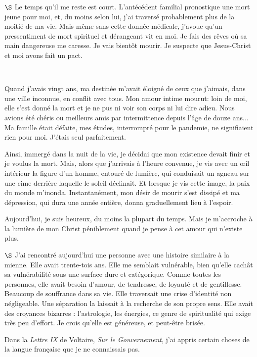 \documentclass[a4paper, 12pt]{article}
\begin{document}
\pagebreak 

$\S$ Le temps qu'il me reste est court. L'antécédent familial pronostique une
mort jeune pour moi, et, du moins selon lui, j'ai traversé probablement plus de
la moitié de ma vie. Mais même sans cette donnée médicale, j'avoue qu'un
pressentiment de mort spirituel et dérangeant vit en moi. Je fais des rêves où
sa main dangereuse me caresse. Je vais bientôt mourir. Je suspecte que
Jesus-Christ et moi avons fait un pact.

~

Quand j'avais vingt ans, ma destinée m'avait éloigné de ceux que j'aimais, dans
une ville inconnue, en conflit avec tous. Mon amour intime mourut: loin de moi,
elle s'est donné la mort et je ne pus ni voir son corps ni lui dire adieu. Nous
avions été chéris ou meilleurs amis par intermittence depuis l'âge de douze
ans... Ma famille était défaite, mes études, interrompré pour le pandemie, ne
signifiaient rien pour moi. J'étais seul parfaitement. 

Ainsi, immergé dans la nuit de la vie, je décidai que mon existence devait finir
et je voulus la mort. Mais, alors que j'arrivais à l'heure convenue, je vis avec
un œil intérieur la figure d'un homme, entouré de lumière, qui conduisait un
agneau sur une cime derrière laquelle le soleil déclinait. Et lorsque je vis
cette image, la paix du monde m'inonda. Instantanément, mon désir de mourir
s'est dissipé et ma dépression, qui dura une année entière, donna graduellement
lieu à l'espoir.

Aujourd'hui, je suis heureux, du moins la plupart du temps. Mais je m'accroche à
la lumière de mon Christ péniblement quand je pense à cet amour qui n'existe
plus.


\pagebreak 

$\S$ J’ai rencontré aujourd’hui une personne avec une histoire similaire à la
mienne. Elle avait trente-tois ans. Elle me semblait vulnérable, bien qu’elle cachât sa
vulnérabilité sous une surface dure et catégorique. Comme toutes les personnes,
elle avait besoin d’amour, de tendresse, de loyauté et de gentillesse. Beaucoup
de souffrance dans sa vie. Elle traversait une crise d’identité non négligeable.
Une séparation la laissait à la recherche de son propre sens. Elle avait des
croyances bizarres : l’astrologie, les énergies, ce genre de spiritualité qui
exige très peu d’effort. Je crois qu’elle est généreuse, et peut-être brisée.

\pagebreak 

Dans la \textit{Lettre IX} de Voltaire, \textit{Sur le Gouvernement}, j'ai
appris certain choses de la langue française que je ne connaissais pas. 
\end{document}
